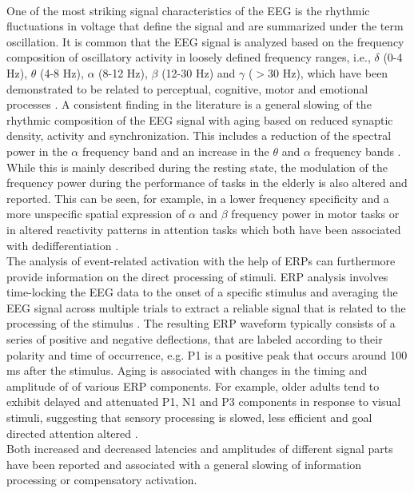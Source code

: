 \\
One of the most striking signal characteristics of the EEG is the rhythmic fluctuations in voltage that define the signal and are summarized under the term oscillation. It is common that the EEG signal is analyzed based on the frequency composition of oscillatory activity in loosely defined frequency ranges, i.e., $\delta$ (0-4 Hz), $\theta$ (4-8 Hz), $\alpha$ (8-12 Hz), $\beta$ (12-30 Hz) and $\gamma$ ($>$30 Hz), which have been demonstrated to be related to perceptual, cognitive, motor and emotional processes \cite{CohenX2017}. A consistent finding in the literature is a general slowing of the rhythmic composition of the EEG signal with aging based on reduced synaptic density, activity and synchronization. This includes a reduction of the spectral power in the $\alpha$ frequency band and an increase in the $\theta$ and $\alpha$ frequency bands \cite{Ishii2017,Courtney2021}. While this is mainly described during the resting state, the modulation of the frequency power during the performance of tasks in the elderly is also altered and reported. This can be seen, for example, in a lower frequency specificity and a more unspecific spatial expression of $\alpha$ and $\beta$ frequency power in motor tasks or in altered reactivity patterns in attention tasks which both have been associated with dedifferentiation \cite{Deiber2013, Quandt2016}.\\
The analysis of event-related activation with the help of ERPs can furthermore provide information on the direct processing of stimuli. ERP analysis involves time-locking the EEG data to the onset of a specific stimulus and averaging the EEG signal across multiple trials to extract a reliable signal that is related to the processing of the stimulus \cite{}. The resulting ERP waveform typically consists of a series of positive and negative deflections, that are labeled according to their polarity and time of occurrence, e.g. P1 is a positive peak that occurs around 100 ms after the stimulus. Aging is associated with changes in the timing and amplitude of of various ERP components. For example, older adults tend to exhibit delayed and attenuated P1, N1 and P3 components in response to visual stimuli, suggesting that sensory processing is slowed, less efficient and goal directed attention altered \cite{Deiber2013}.\\


Both increased and decreased latencies and amplitudes of different signal parts have been reported and associated with a general slowing of information processing or compensatory activation.\\


